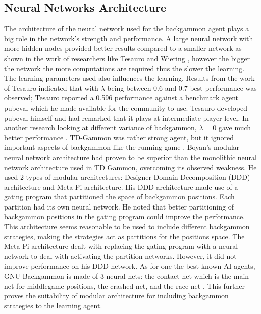\documentclass[12pt,a4paper]{article}
\begin{document}
\subsection{Neural Networks Architecture}
The architecture of the neural network used for the backgammon agent plays a big role in the network’s strength and performance. A large neural network with more hidden nodes provided better results compared to a smaller network as shown in the work of researchers like Tesauro \citeyear{DBLP:journals/ai/Tesauro02} and Wiering \citeyear{DBLP:journals/jilsa/Wiering10}, however the bigger the network the more computations are required thus the slower the learning. The learning parameters used also influences the learning. Results from the work of Tesauro \citeyear{DBLP:journals/ml/Tesauro98} indicated that with $\lambda$ being between 0.6 and 0.7 best performance was observed; Tesauro \citeyear{pubeval} reported a 0.596 performance against a benchmark agent pubeval which he made available for the community to use. Tesauro developed pubeval himself and had remarked that it plays at intermediate player level. In another research looking at different variance of backgammon, $\lambda=0$ gave much better performance \cite{DBLP:conf/ifip12/PapahristouR12}. TD-Gammon was rather strong agent, but it ignored important aspects of backgammon like the running game \cite{survey}. Boyan's \citeyear{boyan} modular neural network architecture had proven to be superior than the monolithic neural network architecture used in TD Gammon, overcoming its observed weakness. He used 2 types of modular architectures: Designer Domain Decomposition (DDD) architecture and Meta-Pi architecture. His DDD architecture made use of a gating program that partitioned the space of backgammon positions. Each partition had its own neural network. He noted that better partitioning of backgammon positions in the gating program could improve the performance. This architecture seems reasonable to be used to include different backgammon strategies, making the strategies act as partitions for the positions space. The Meta-Pi architecture dealt with replacing the gating program with a neural network to deal with activating the partition networks. However, it did not improve performance on his DDD network. As for one the best-known AI agents, GNU-Backgammon is made of 3 neural nets: the contact net which is the main net for middlegame positions, the crashed net, and the race net \cite{gnubg}. This further proves the suitability of modular architecture for including backgammon strategies to the learning agent.
\end{document}
